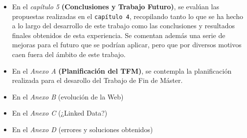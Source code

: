 \begin{itemize}

	\item En el \textit{capítulo 5} \textbf{(Conclusiones y Trabajo Futuro)}, se evalúan las propuestas realizadas en el \texttt{capítulo 4}, recopilando tanto lo que se ha hecho a lo largo del desarrollo de este trabajo como las conclusiones y resultados finales obtenidos de esta experiencia. Se comentan además una serie de mejoras para el futuro que se podrían aplicar, pero que por diversos motivos caen fuera del ámbito de este trabajo.
	
	\item En el \textit{Anexo A} \textbf{(Planificación del TFM)}, se contempla la planificación realizada para el desarollo del Trabajo de Fin de Máster.
	
	\item En el \textit{Anexo B} (evolución de la Web)
	
	\item En el \textit{Anexo C} (¿Linked Data?)
		
	\item En el \textit{Anexo D} (errores y soluciones obtenidos)
			
	
\end{itemize}


